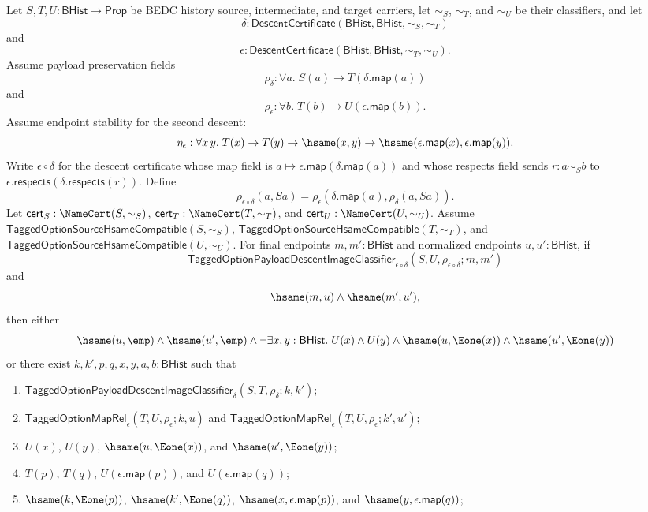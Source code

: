 \begin{theorem}
Let $S,T,U:\mathsf{BHist}\to\mathsf{Prop}$ be BEDC history source,
intermediate, and target carriers, let $\sim_S$, $\sim_T$, and $\sim_U$ be their
classifiers, and let
$$
\delta:\mathsf{DescentCertificate}(\mathsf{BHist},\mathsf{BHist},\sim_S,\sim_T)
$$
and
$$
\epsilon:\mathsf{DescentCertificate}(\mathsf{BHist},\mathsf{BHist},\sim_T,\sim_U).
$$
Assume payload preservation fields
$$
\rho_{\delta}:\forall a.\;S(a)\to T(\delta.\mathsf{map}(a))
$$
and
$$
\rho_{\epsilon}:\forall b.\;T(b)\to U(\epsilon.\mathsf{map}(b)).
$$
Assume endpoint stability for the second descent:
$$
\eta_{\epsilon}:\forall x\,y.\;
T(x)\to T(y)\to \hsame(x,y)\to
\hsame(\epsilon.\mathsf{map}(x),\epsilon.\mathsf{map}(y)).
$$
Write $\epsilon\circ\delta$ for the descent certificate whose map field is
$a\mapsto\epsilon.\mathsf{map}(\delta.\mathsf{map}(a))$ and whose respects field
sends $r:a\sim_S b$ to
$\epsilon.\mathsf{respects}(\delta.\mathsf{respects}(r))$. Define
$$
\rho_{\epsilon\circ\delta}(a,Sa)=
\rho_{\epsilon}(\delta.\mathsf{map}(a),\rho_{\delta}(a,Sa)).
$$
Let $\mathsf{cert}_S:\NameCert(S,\sim_S)$,
$\mathsf{cert}_T:\NameCert(T,\sim_T)$, and
$\mathsf{cert}_U:\NameCert(U,\sim_U)$. Assume
$\mathsf{TaggedOptionSourceHsameCompatible}(S,\sim_S)$,
$\mathsf{TaggedOptionSourceHsameCompatible}(T,\sim_T)$, and
$\mathsf{TaggedOptionSourceHsameCompatible}(U,\sim_U)$. For final endpoints
$m,m':\mathsf{BHist}$ and normalized endpoints $u,u':\mathsf{BHist}$, if
$$
\mathsf{TaggedOptionPayloadDescentImageClassifier}_{\epsilon\circ\delta}
(S,U,\rho_{\epsilon\circ\delta};m,m')
$$
and
$$
\hsame(m,u)\land \hsame(m',u'),
$$
then either
$$
\hsame(u,\emp)\land \hsame(u',\emp)\land
\neg\exists x,y:\mathsf{BHist}.\;
U(x)\land U(y)\land
\hsame(u,\Eone(x))\land
\hsame(u',\Eone(y))
$$
or there exist $k,k',p,q,x,y,a,b:\mathsf{BHist}$ such that
\begin{enumerate}
\item $\mathsf{TaggedOptionPayloadDescentImageClassifier}_{\delta}
(S,T,\rho_{\delta};k,k')$;
\item $\mathsf{TaggedOptionMapRel}_{\epsilon}(T,U,\rho_{\epsilon};k,u)$ and
$\mathsf{TaggedOptionMapRel}_{\epsilon}(T,U,\rho_{\epsilon};k',u')$;
\item $U(x)$, $U(y)$, $\hsame(u,\Eone(x))$, and
$\hsame(u',\Eone(y))$;
\item $T(p)$, $T(q)$, $U(\epsilon.\mathsf{map}(p))$, and
$U(\epsilon.\mathsf{map}(q))$;
\item $\hsame(k,\Eone(p))$, $\hsame(k',\Eone(q))$,
$\hsame(x,\epsilon.\mathsf{map}(p))$, and
$\hsame(y,\epsilon.\mathsf{map}(q))$;

\end{enumerate}
\end{theorem}
